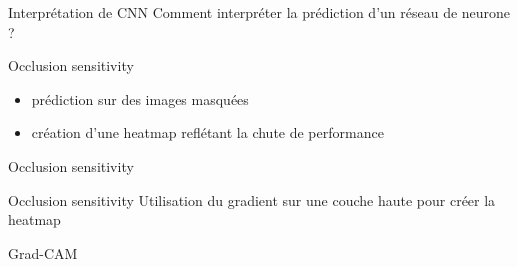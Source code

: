 \begin{frame}{Interprétation de CNN}
  Comment interpréter la prédiction d'un réseau de neurone ?
\end{frame}

\begin{frame}{Occlusion sensitivity}
  \begin{itemize}
    \item prédiction sur des images \og masquées \fg
    \item création d'une heatmap reflétant la chute de performance 
  \end{itemize}
\end{frame}

\begin{frame}{Occlusion sensitivity}
\end{frame}

\begin{frame}{Occlusion sensitivity}
  Utilisation du gradient sur une couche haute pour créer la heatmap
\end{frame}

\begin{frame}{Grad-CAM}
\end{frame}
  